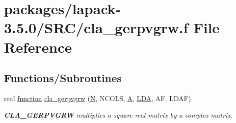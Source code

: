 \hypertarget{cla__gerpvgrw_8f}{}\section{packages/lapack-\/3.5.0/\+S\+R\+C/cla\+\_\+gerpvgrw.f File Reference}
\label{cla__gerpvgrw_8f}
\subsection*{Functions/\+Subroutines}
\begin{DoxyCompactItemize}
\item 
real \hyperlink{afunc_8m_a7b5e596df91eadea6c537c0825e894a7}{function} \hyperlink{group__complexGEcomputational_ga30ebdf9137986a237c939500cbd46a41}{cla\+\_\+gerpvgrw} (\hyperlink{polmisc_8c_a0240ac851181b84ac374872dc5434ee4}{N}, N\+C\+O\+L\+S, \hyperlink{classA}{A}, \hyperlink{example__user_8c_ae946da542ce0db94dced19b2ecefd1aa}{L\+D\+A}, A\+F, L\+D\+A\+F)
\begin{DoxyCompactList}\small\item\em {\bfseries C\+L\+A\+\_\+\+G\+E\+R\+P\+V\+G\+R\+W} multiplies a square real matrix by a complex matrix. \end{DoxyCompactList}\end{DoxyCompactItemize}
